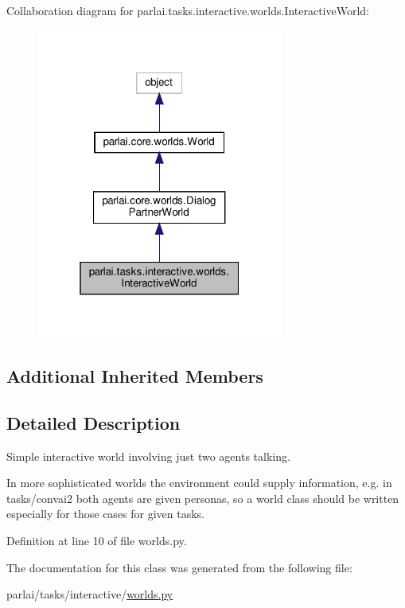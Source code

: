 Collaboration diagram for parlai.\+tasks.\+interactive.\+worlds.\+Interactive\+World\+:
\nopagebreak
\begin{figure}[H]
\begin{center}
\leavevmode
\includegraphics[width=229pt]{d4/d40/classparlai_1_1tasks_1_1interactive_1_1worlds_1_1InteractiveWorld__coll__graph}
\end{center}
\end{figure}
\subsection*{Additional Inherited Members}


\subsection{Detailed Description}
\begin{DoxyVerb}Simple interactive world involving just two agents talking.

In more sophisticated worlds the environment could supply information, e.g. in
tasks/convai2 both agents are given personas, so a world class should be written
especially for those cases for given tasks.
\end{DoxyVerb}
 

Definition at line 10 of file worlds.\+py.



The documentation for this class was generated from the following file\+:\begin{DoxyCompactItemize}
\item 
parlai/tasks/interactive/\hyperlink{parlai_2tasks_2interactive_2worlds_8py}{worlds.\+py}\end{DoxyCompactItemize}
